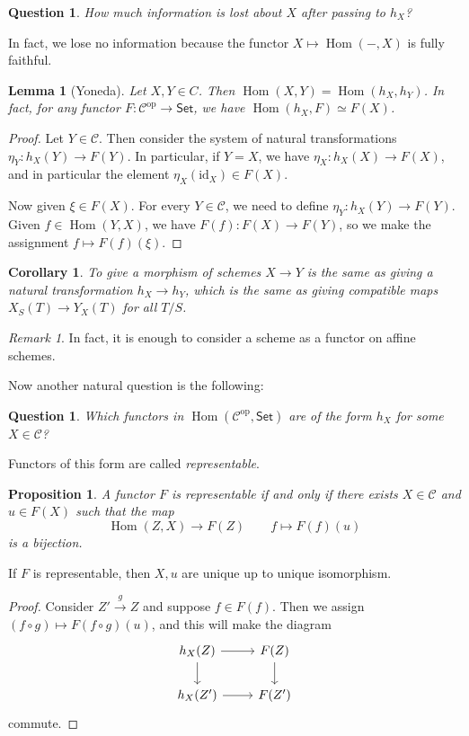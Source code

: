 \documentclass[leqno, openany]{memoir}
\newtheorem{cor}[thm]{Corollary}
\newtheorem{prop}[thm]{Proposition}
\newtheorem{lem}[thm]{Lemma}
\newtheorem{quest}[thm]{Question}
\theoremstyle{definition}
\theoremstyle{remark}
\newtheorem{rmk}[thm]{Remark}
\theoremstyle{plain}
\theoremstyle{definition}
\theoremstyle{remark}
\newcommand{\mc}[1]{\mathcal{#1}}
\newcommand{\mr}[1]{\mathrm{#1}}
\newcommand{\ms}[1]{\mathsf{#1}}
\renewcommand{\op}{\mathrm{op}}
\DeclareMathOperator{\Hom}{Hom}
\begin{document}
\begin{quest} How much information is lost about $X$ after passing to $h_X$?
    \end{quest} In fact, we lose no information because the functor $X \mapsto
    \Hom(-,X)$ is fully faithful.  \begin{lem}[Yoneda] Let $X,Y \in C$. Then
        $\Hom(X,Y) = \Hom(h_X, h_Y)$. In fact, for any functor $F \colon
        \mc{C}^{\op} \to \ms{Set}$, we have $\Hom(h_X, F) \simeq F(X)$.
    \end{lem}

\begin{proof} Let $Y \in \mc{C}$. Then consider the system of natural
    transformations $\eta_Y \colon h_X(Y) \to F(Y)$. In particular, if $Y = X$,
    we have $\eta_X \colon h_X(X) \to F(X)$, and in particular the element
    $\eta_X(\mr{id}_X) \in F(X)$.

    Now given $\xi \in F(X)$. For every $Y \in \mc{C}$, we need to define
$\eta_Y \colon h_X(Y) \to F(Y)$. Given $f \in \Hom(Y,X)$, we have $F(f) \colon
F(X) \to F(Y)$, so we make the assignment $f \mapsto F(f)(\xi)$.  \end{proof}

\begin{cor} To give a morphism of schemes $X \to Y$ is the same as giving a
natural transformation $h_X \to h_Y$, which is the same as giving compatible
maps $X_S(T) \to Y_X(T)$ for all $T/S$.  \end{cor}

\begin{rmk} In fact, it is enough to consider a scheme as a functor on affine
schemes.  \end{rmk}

Now another natural question is the following: \begin{quest} Which functors in
    $\Hom(\mc{C}^{\op}, \ms{Set})$ are of the form $h_X$ for some $X \in
    \mc{C}$?  \end{quest} Functors of this form are called
    \textit{representable}.  \begin{prop} A functor $F$ is representable if and
        only if there exists $X \in \mc{C}$ and $u \in F(X)$ such that the map
        \[ \Hom(Z,X) \to F(Z) \qquad f \mapsto F(f)(u) \] is a bijection.
    \end{prop} If $F$ is representable, then $X,u$ are unique up to unique
    isomorphism.  \begin{proof} Consider $Z' \xrightarrow{g} Z$ and suppose $f
        \in F(f)$. Then we assign $(f \circ g) \mapsto F(f \circ g)(u)$, and
        this will make the diagram \begin{equation*} \begin{tikzcd} h_X(Z)
            \arrow{r} \arrow{d} & F(Z) \arrow{d} \\ h_X(Z') \arrow{r} & F(Z')
        \end{tikzcd} \end{equation*} commute.  \end{proof}
\end{document}
